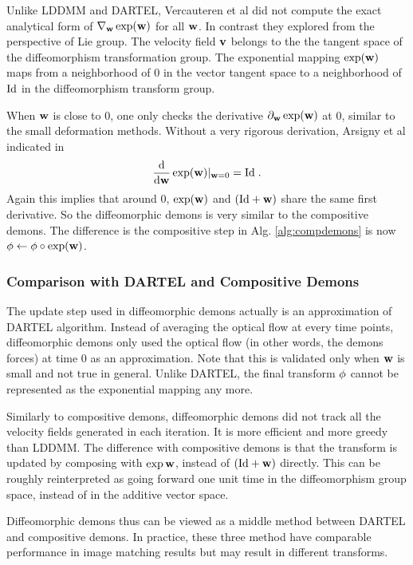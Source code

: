 \documentclass[letterpaper,12pt]{article}
\begin{document}
Unlike LDDMM and DARTEL, Vercauteren et al did not compute the exact analytical form of $\nabla_{\mathbf{w}} \exp(\mathbf{w})$ for all $\mathbf{w}$. In contrast they explored from the perspective of Lie group. The velocity field $\mathbf{v}$ belongs to the the tangent space of the diffeomorphism transformation group. The exponential mapping $\exp(\mathbf{w})$ maps from a neighborhood of $0$ in the vector tangent space to a neighborhood of $\text{Id}$ in the diffeomorphism transform group. 

When $\mathbf{w}$ is close to $0$, one only checks the derivative $\partial_{\mathbf{w}}\exp(\mathbf{w})$ at $0$, similar to the small deformation methods. Without a very rigorous derivation, Arsigny et al indicated in \cite{Arsigny2006} 
\begin{align}
\frac{\text{d}}{\text{d}\mathbf{w}} \exp(\mathbf{w}) \rvert_{\mathbf{w}=0} = \text{Id} \; .
\end{align}
Again this implies that around 0, $\exp(\mathbf{w})$ and $(\text{Id}+\mathbf{w})$ share the same first derivative. So the diffeomorphic demons is very similar to the compositive demons. The difference is the compositive step in Alg. \ref{alg:compdemons} is now $\phi \leftarrow \phi \circ \exp(\mathbf{w})$. 

\subsubsection{Comparison with DARTEL and Compositive Demons}

The update step used in diffeomorphic demons actually is an approximation of DARTEL algorithm. Instead of averaging the optical flow at every time points, diffeomorphic demons only used the optical flow (in other words, the demons forces) at time $0$ as an approximation. Note that this is validated only when $\mathbf{w}$ is small and not true in general. Unlike DARTEL, the final transform $\phi$ cannot be represented as the exponential mapping any more.

Similarly to compositive demons, diffeomorphic demons did not track all the velocity fields generated in each iteration. It is more efficient and more greedy than LDDMM. The difference with compositive demons is that the transform is updated by composing with $\exp{\mathbf{w}}$, instead of $(\text{Id}+\mathbf{w})$ directly. This can be roughly reinterpreted as going forward one unit time in the diffeomorphism group space, instead of in the additive vector space.

Diffeomorphic demons thus can be viewed as a middle method between DARTEL and compositive demons. In practice, these three method have comparable performance \cite{Hernandez2008b,Vercauteren2009} in image matching results but may result in different transforms.
\end{document}
